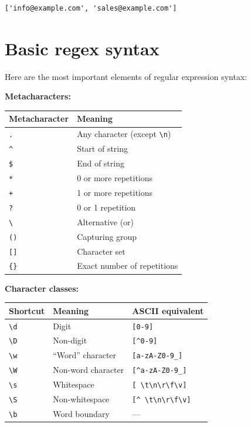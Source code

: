 \documentclass[
  english,
  letterpaper,
  DIV=11,
  numbers=noendperiod]{scrreprt}
\newcounter{none} %
\begin{document}
\begin{verbatim}
['info@example.com', 'sales@example.com']
\end{verbatim}

\section{Basic regex syntax}\label{basic-regex-syntax}

Here are the most important elements of regular expression syntax:

\textbf{Metacharacters:}

{\def\LTcaptype{none} %
\begin{longtable}[]{@{}ll@{}}
\toprule\noalign{}
Metacharacter & Meaning \\
\midrule\noalign{}
\endhead
\bottomrule\noalign{}
\endlastfoot
\texttt{.} & Any character (except \texttt{\textbackslash{}n}) \\
\texttt{\^{}} & Start of string \\
\texttt{\$} & End of string \\
\texttt{*} & 0 or more repetitions \\
\texttt{+} & 1 or more repetitions \\
\texttt{?} & 0 or 1 repetition \\
\texttt{\textbackslash{}\textbar{}} & Alternative (or) \\
\texttt{()} & Capturing group \\
\texttt{{[}{]}} & Character set \\
\texttt{\{\}} & Exact number of repetitions \\
\end{longtable}
}

\textbf{Character classes:}

{\def\LTcaptype{none} %
\begin{longtable}[]{@{}lll@{}}
\toprule\noalign{}
Shortcut & Meaning & ASCII equivalent \\
\midrule\noalign{}
\endhead
\bottomrule\noalign{}
\endlastfoot
\texttt{\textbackslash{}d} & Digit & \texttt{{[}0-9{]}} \\
\texttt{\textbackslash{}D} & Non-digit & \texttt{{[}\^{}0-9{]}} \\
\texttt{\textbackslash{}w} & ``Word'' character &
\texttt{{[}a-zA-Z0-9\_{]}} \\
\texttt{\textbackslash{}W} & Non-word character &
\texttt{{[}\^{}a-zA-Z0-9\_{]}} \\
\texttt{\textbackslash{}s} & Whitespace &
\texttt{{[}\ \textbackslash{}t\textbackslash{}n\textbackslash{}r\textbackslash{}f\textbackslash{}v{]}} \\
\texttt{\textbackslash{}S} & Non-whitespace &
\texttt{{[}\^{}\ \textbackslash{}t\textbackslash{}n\textbackslash{}r\textbackslash{}f\textbackslash{}v{]}} \\
\texttt{\textbackslash{}b} & Word boundary & --- \\
\end{longtable}
}
\end{document}
